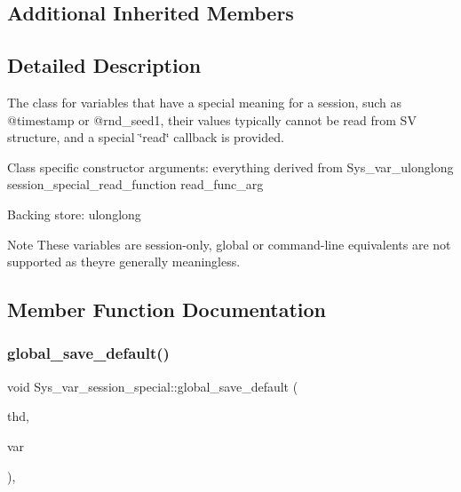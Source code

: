 \subsection*{Additional Inherited Members}


\subsection{Detailed Description}
The class for variables that have a special meaning for a session, such as @timestamp or @rnd\+\_\+seed1, their values typically cannot be read from SV structure, and a special \char`\"{}read\char`\"{} callback is provided.

Class specific constructor arguments\+: everything derived from Sys\+\_\+var\+\_\+ulonglong session\+\_\+special\+\_\+read\+\_\+function read\+\_\+func\+\_\+arg

Backing store\+: ulonglong

\begin{DoxyNote}{Note}
These variables are session-\/only, global or command-\/line equivalents are not supported as they\textquotesingle{}re generally meaningless. 
\end{DoxyNote}


\subsection{Member Function Documentation}
\mbox{\label{classSys__var__session__special_aae482b58f68b85585c41527fcb71c7d9}} 
\subsubsection{\texorpdfstring{global\+\_\+save\+\_\+default()}{global\_save\_default()}}
{\footnotesize\ttfamily void Sys\+\_\+var\+\_\+session\+\_\+special\+::global\+\_\+save\+\_\+default (\begin{DoxyParamCaption}\item[{T\+HD $\ast$}]{thd,  }\item[{\mbox{\hyperlink{classset__var}{set\+\_\+var}} $\ast$}]{var }\end{DoxyParamCaption})\hspace{0.3cm}{\ttfamily [inline]}, {\ttfamily [virtual]}}

